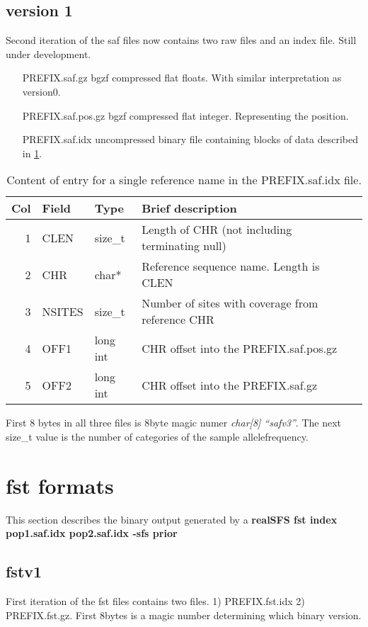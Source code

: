 \documentclass[10pt]{article}
\begin{document}
\subsection{version 1}
Second iteration of the saf files now contains two raw files and an index file. Still under development.
\begin{itemize}
\item[PREFIX.saf.gz] bgzf compressed flat floats. With similar interpretation as version0.
\item[PREFIX.saf.pos.gz] bgzf compressed flat integer. Representing the position.
\item[PREFIX.saf.idx] uncompressed binary file containing blocks of data described in \ref{tab1}.
\end{itemize}
\begin{table}
\begin{tabular}{rllll}
  \hline
  {\bf Col} & {\bf Field} & {\bf Type} & {\bf Brief description} \\
  \hline
  1 & {\sf CLEN} & size\_t &  Length of CHR (not including terminating null)\\
  2 & {\sf CHR} & char* & Reference sequence name. Length is CLEN\\
  3 & {\sf NSITES} & size\_t & Number of sites with coverage from reference CHR\\
  4 & {\sf OFF1} & long int & CHR offset into the PREFIX.saf.pos.gz \\
  5 & {\sf OFF2} & long int & CHR offset into the PREFIX.saf.gz \\
  \hline
\end{tabular}\label{tab1}
\caption{Content of entry for a single reference name in the PREFIX.saf.idx file.}
\end{table}
First 8 bytes in all three files is 8byte magic numer \emph{char[8]
  ``safv3''}. The next size\_t value is the number of categories of the sample allelefrequency.
\clearpage
\section{fst formats}
This section describes the binary output generated by a \textbf{realSFS fst index pop1.saf.idx pop2.saf.idx -sfs prior}
\subsection{fstv1}

First iteration of the fst files contains two files. 1) PREFIX.fst.idx 2) PREFIX.fst.gz.
First 8bytes is a magic number determining which binary version.
\end{document}
